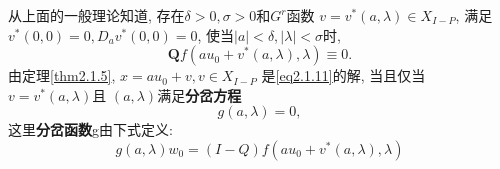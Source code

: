 从上面的一般理论知道,
存在\(\delta>0, \sigma>0\)和\(G^{r}\)函数
\(v=v^{*}(a, \lambda) \in X_{I-P}\),
满足\(v^{*}(0,0)=0, D_{a} v^{*}(0,0)=0\),
使当\(|a|<\delta,|\lambda|<\sigma\)时,
\begin{equation*}
\mathbf{Q}f\left(a u_{0}+v^{*}(a, \lambda), \lambda\right) \equiv 0.
\end{equation*}
由定理\ref{thm2.1.5},
\(
x=a u_{0}+v, v \in X_{I-P}
\)
是\eqref{eq2.1.11}的解,
当且仅当
\(v=v^{*}(a, \lambda) \)且
\((a,\lambda)\)满足\textbf{分岔方程}
\begin{equation*}
g(a, \lambda)=0,
\end{equation*}
这里\textbf{分岔函数}g由下式定义:
\begin{equation}
  \label{eq2.1.12}
  g(a, \lambda) w_{0}=(I-Q) f\left(a u_{0}+v^{*}(a, \lambda), \lambda\right)
\end{equation}

